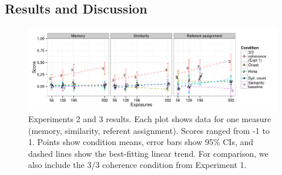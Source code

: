 \documentclass[man,floatsintext]{apa6}
\begin{document}
\subsection{Results and Discussion}

\begin{figure}[t]
  \begin{center}
    \includegraphics[width=1.0\linewidth]{x23}
    \caption{Experiments 2 and 3 results. Each plot shows data for one measure (memory, similarity, referent assignment). Scores ranged from -1 to 1. Points show condition means, error bars show 95\% CIs, and dashed lines show the best-fitting linear trend. For comparison, we also include the 3/3 coherence condition from Experiment 1.}
    \label{expt23-results}
  \end{center}
\end{figure}
\end{document}
